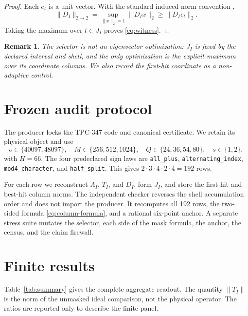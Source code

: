 \documentclass[10pt]{article}
\newtheorem{remark}{Remark}
\begin{document}
\begin{proof}
Each $e_t$ is a unit vector.  With the standard induced-norm convention
\cite{conway2000},
\[
\|D_I\|_{2\to2}=\sup_{\|x\|_2=1}\|D_Ix\|_2\geq\|D_Ie_t\|_2.
\]
Taking the maximum over $t\in J_I$ proves
\eqref{eq:witness}.
\end{proof}

\begin{remark}
The selector is not an eigenvector optimization: $J_I$ is fixed by the
declared interval and shell, and the only optimization is the explicit maximum
over its coordinate columns.  We also record the first-hit coordinate as a
non-adaptive control.
\end{remark}

\section{Frozen audit protocol}

The producer locks the TPC-347 code and canonical certificate.  We retain its
physical object and use
\[
 o\in\{40097,48097\},\quad M\in\{256,512,1024\},\quad
 Q\in\{24,36,54,80\},\quad s\in\{1,2\},
\]
with $H=66$.  The four predeclared sign laws are
\texttt{all\_plus}, \texttt{alternating\_index},
\texttt{mod4\_character}, and \texttt{half\_split}.
This gives
$2\cdot3\cdot4\cdot2\cdot4=192$ rows.

For each row we reconstruct $A_I$, $T_I$, and $D_I$, form $J_I$, and store the
first-hit and best-hit column norms.  The independent checker reverses the
shell accumulation order and does not import the producer.  It recomputes all
192 rows, the two-sided formula \eqref{eq:column-formula}, and a rational
six-point anchor.  A separate stress suite mutates the selector, each side of
the mask formula, the anchor, the census, and the claim firewall.

\section{Finite results}

Table~\ref{tab:summary} gives the complete aggregate readout.  The quantity
$\|T_I\|$ is the norm of the unmasked ideal comparison, not the physical
operator.  The ratios are reported only to describe the finite panel.
\end{document}

